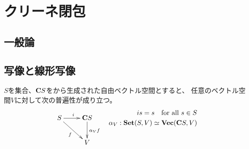 \section{クリーネ閉包}\label{s1:クリーネ閉包} %
\subsection{一般論}\label{s2:一般論} %
\subsection{写像と線形写像}\label{s2:写像と線形写像} %
	$S$を集合、$\mathbf{C} S$をから生成された自由ベクトル空間とすると、
	任意のベクトル空間$V$に対して次の普遍性が成り立つ。
	\begin{equation*}\begin{split}
		\xymatrix{
			S \ar[r]^{i} \ar[rd]_{f} & \fukuso S \ar[d]^{\alpha_Vf} \\
			& V
		}\quad \begin{split}
			is = s \quad\text{for all }s\in S \\
			\alpha_V: \mybf{Set}(S, V)\simeq \Vect(\fukuso S, V) \\
		\end{split}
	\end{split}\end{equation*}
